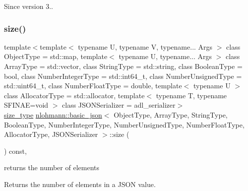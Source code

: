\begin{DoxySince}{Since}
version 3.. 
\end{DoxySince}
\mbox{\label{classnlohmann_1_1basic__json_a25e27ad0c6d53c01871c5485e1f75b96}} 
\subsubsection{\texorpdfstring{size()}{size()}}
{\footnotesize\ttfamily template$<$template$<$ typename U, typename V, typename... Args $>$ class Object\+Type = std\+::map, template$<$ typename U, typename... Args $>$ class Array\+Type = std\+::vector, class String\+Type  = std\+::string, class Boolean\+Type  = bool, class Number\+Integer\+Type  = std\+::int64\+\_\+t, class Number\+Unsigned\+Type  = std\+::uint64\+\_\+t, class Number\+Float\+Type  = double, template$<$ typename U $>$ class Allocator\+Type = std\+::allocator, template$<$ typename T, typename S\+F\+I\+N\+A\+E=void $>$ class J\+S\+O\+N\+Serializer = adl\+\_\+serializer$>$ \\
\mbox{\hyperlink{classnlohmann_1_1basic__json_a39f2cd0b58106097e0e67bf185cc519b}{size\+\_\+type}} \mbox{\hyperlink{classnlohmann_1_1basic__json}{nlohmann\+::basic\+\_\+json}}$<$ Object\+Type, Array\+Type, String\+Type, Boolean\+Type, Number\+Integer\+Type, Number\+Unsigned\+Type, Number\+Float\+Type, Allocator\+Type, J\+S\+O\+N\+Serializer $>$\+::size (\begin{DoxyParamCaption}{ }\end{DoxyParamCaption}) const\hspace{0.3cm}{\ttfamily [inline]}, {\ttfamily [noexcept]}}



returns the number of elements 

Returns the number of elements in a J\+S\+ON value.

